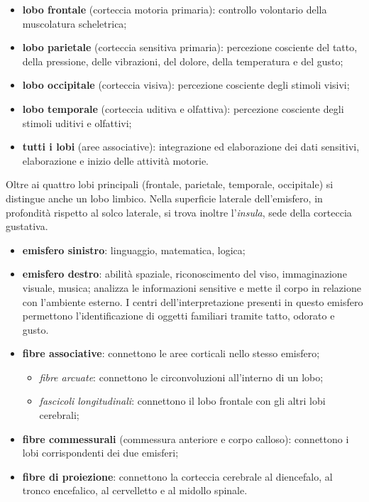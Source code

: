 \begin{itemize}
  \item \textbf{lobo frontale} (corteccia motoria primaria): controllo
    volontario della muscolatura scheletrica;
  \item \textbf{lobo parietale} (corteccia sensitiva primaria): percezione
    cosciente del tatto, della pressione, delle vibrazioni, del dolore,
    della temperatura e del gusto;
  \item \textbf{lobo occipitale} (corteccia visiva): percezione cosciente
    degli stimoli visivi;
  \item \textbf{lobo temporale} (corteccia uditiva e olfattiva): percezione
    cosciente degli stimoli uditivi e olfattivi;
  \item \textbf{tutti i lobi} (aree associative): integrazione ed
    elaborazione dei dati sensitivi, elaborazione e inizio delle attività
    motorie.
\end{itemize}
Oltre ai quattro lobi principali (frontale, parietale, temporale,
occipitale) si distingue anche un lobo limbico. Nella superficie laterale
dell'emisfero, in profondità rispetto al solco laterale, si trova inoltre
l'\textit{insula}, sede della corteccia gustativa.

\begin{itemize}
  \item \textbf{emisfero sinistro}: linguaggio, matematica, logica;
  \item \textbf{emisfero destro}: abilità spaziale, riconoscimento del
    viso, immaginazione visuale, musica; analizza le informazioni sensitive
    e mette il corpo in relazione con l'ambiente esterno. I centri
    dell'interpretazione presenti in questo emisfero permettono
    l'identificazione di oggetti familiari tramite tatto, odorato e gusto.
\end{itemize}

\begin{itemize}
  \item \textbf{fibre associative}: connettono le aree corticali nello
    stesso emisfero;
  \begin{itemize}
    \item \textit{fibre arcuate}: connettono le circonvoluzioni all'interno
      di un lobo;
    \item \textit{fascicoli longitudinali}: connettono il lobo frontale con
      gli altri lobi cerebrali;
  \end{itemize}
  \item \textbf{fibre commessurali} (commessura anteriore e corpo calloso):
    connettono i lobi corrispondenti dei due emisferi;
  \item \textbf{fibre di proiezione}: connettono la corteccia cerebrale al
    diencefalo, al tronco encefalico, al cervelletto e al midollo spinale.
\end{itemize}

